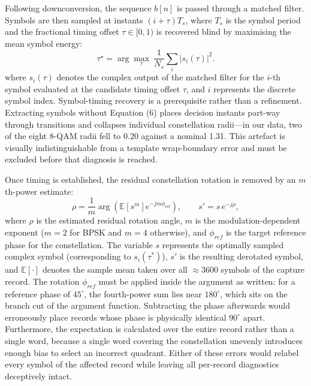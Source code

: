 \documentclass[journal]{IEEEtran}   %
\begin{document}
Following downconversion, the sequence $b[n]$ is passed through a matched filter. Symbols are then sampled at instants $(i+\tau)T_s$, where $T_s$ is the symbol period and the fractional timing offset $\tau \in [0, 1)$ is recovered blind by maximising the mean symbol energy:   
\begin{equation}
\tau^{\star} = \arg\max_{\tau} \ \frac{1}{N_s}\sum_{i} \big| s_i(\tau) \big|^2 .
\label{eq:timing}
\end{equation}
where $s_i(\tau)$ denotes the complex output of the matched filter for the $i$-th symbol evaluated at the candidate timing offset $\tau$, and $i$ represents the discrete symbol index. Symbol-timing recovery is a prerequisite rather than a refinement. Extracting symbols without Equation (6) places decision instants part-way through transitions and collapses individual constellation radii—in our data, two of the eight 8-QAM radii fell to 0.20 against a nominal 1.31. This artefact is visually indistinguishable from a template wrap-boundary error and must be excluded before that diagnosis is reached. 

Once timing is established, the residual constellation rotation is removed by an $m$th-power estimate:
\begin{equation}
\rho = \frac{1}{m}\arg\!\left(
  \mathbb{E}\!\left[s^m\right] e^{-j m \phi_{\mathrm{ref}}}\right),
\qquad s' = s\,e^{-j\rho},
\label{eq:derotate}
\end{equation}
where $\rho$ is the estimated residual rotation angle, $m$ is the modulation-dependent exponent ($m = 2$ for BPSK and $m = 4$ otherwise), and $\phi_{ref}$ is the target reference phase for the constellation. The variable $s$ represents the optimally sampled complex symbol (corresponding to $s_i(\tau^*)$), $s'$ is the resulting derotated symbol, and $\mathbb{E}[\cdot]$ denotes the sample mean taken over all $\approx 3600$ symbols of the capture record.   The rotation $\phi_{ref}$ must be applied inside the argument as written: for a reference phase of $45^\circ$, the fourth-power sum lies near $180^\circ$, which sits on the branch cut of the argument function. Subtracting the phase afterwards would erroneously place records whose phase is physically identical $90^\circ$ apart. Furthermore, the expectation is calculated over the entire record rather than a single word, because a single word covering the constellation unevenly introduces enough bias to select an incorrect quadrant. Either of these errors would relabel every symbol of the affected record while leaving all per-record diagnostics deceptively intact.
\end{document}
